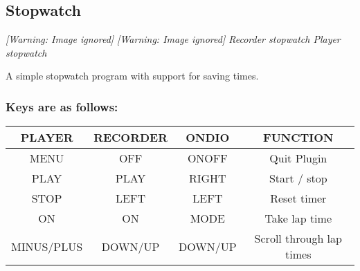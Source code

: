 \subsection{Stopwatch}
{\centering\itshape
  [Warning: Image ignored] %
 \textmd{  }  [Warning: Image ignored]
 \newline
Recorder stopwatch  Player stopwatch  
\par}

A simple stopwatch program with support for saving times.

\subsubsection{Keys are as follows:}

\begin{table}[h!]
\begin{tabular}{|c|c|c|c|}
\hline
PLAYER & RECORDER & ONDIO & FUNCTION \\\hline
MENU & OFF & ONOFF & Quit Plugin \\\hline
PLAY & PLAY & RIGHT & Start / stop \\\hline
STOP & LEFT & LEFT & Reset timer \\\hline
ON & ON & MODE & Take lap time \\\hline
MINUS/PLUS & DOWN/UP & DOWN/UP & Scroll through lap times \\\hline
\end{tabular}
\end{table}
